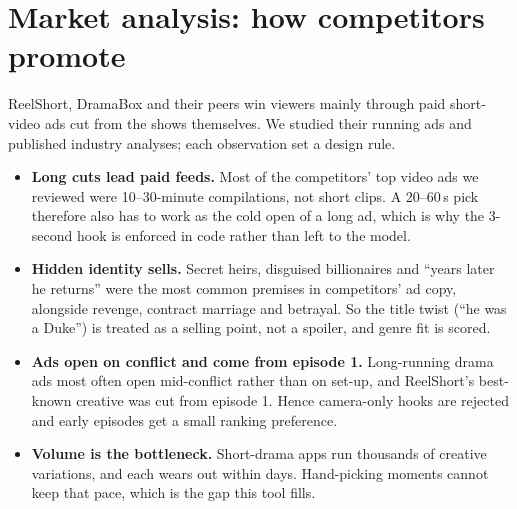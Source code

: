 \documentclass[10pt]{article}
\begin{document}
\section{Market analysis: how competitors promote}
ReelShort, DramaBox and their peers win viewers mainly through paid short-video ads cut from the shows themselves. We
studied their running ads and published industry analyses; each observation set a design rule.
\begin{itemize}
\item \textbf{Long cuts lead paid feeds.} Most of the competitors' top video ads we reviewed were 10--30-minute
compilations, not short clips. A 20--60\,s pick therefore also has to work as the cold open of a long ad, which is why the
3-second hook is enforced in code rather than left to the model.
\item \textbf{Hidden identity sells.} Secret heirs, disguised billionaires and ``years later he returns'' were the most
common premises in competitors' ad copy, alongside revenge, contract marriage and betrayal. So the title twist (``he was a
Duke'') is treated as a selling point, not a spoiler, and genre fit is scored.
\item \textbf{Ads open on conflict and come from episode 1.} Long-running drama ads most often open mid-conflict rather than
on set-up, and ReelShort's best-known creative was cut from episode 1. Hence camera-only hooks are rejected and early
episodes get a small ranking preference.
\item \textbf{Volume is the bottleneck.} Short-drama apps run thousands of creative variations, and each wears out within
days. Hand-picking moments cannot keep that pace, which is the gap this tool fills.
\end{itemize}
\end{document}
